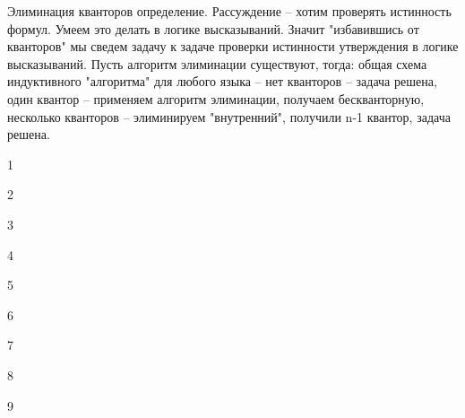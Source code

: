 Элиминация кванторов определение. Рассуждение -- хотим проверять истинность формул. Умеем это делать в логике высказываний. Значит "избавившись от кванторов" мы сведем задачу к задаче проверки истинности утверждения в логике высказываний.
Пусть алгоритм элиминации существуют, тогда: общая схема индуктивного "алгоритма" для любого языка -- нет кванторов -- задача решена, один квантор -- применяем алгоритм элиминации, получаем бескванторную, несколько кванторов -- элиминируем "внутренний", получили n-1 квантор, задача решена.

1

2

3

4

5

6

7

8

9

